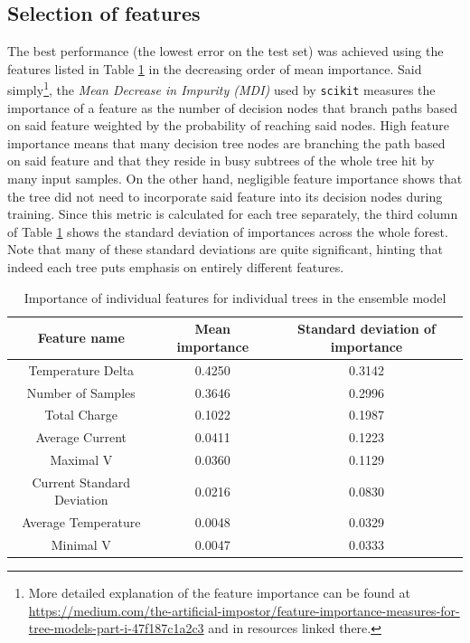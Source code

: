 \subsection{Selection of features}

The best performance (the lowest error on the test set) was achieved using the features listed in Table \ref{tab:12-importance} in the decreasing order of mean importance. Said simply\footnote{More detailed explanation of the feature importance can be found at \url{https://medium.com/the-artificial-impostor/feature-importance-measures-for-tree-models-part-i-47f187c1a2c3} and in resources linked there.}, the \textit{Mean Decrease in Impurity (MDI)} used by \texttt{scikit} measures the importance of a feature as the number of decision nodes that branch paths based on said feature weighted by the probability of reaching said nodes. 
High feature importance means that many decision tree nodes are branching the path based on said feature and that they reside in busy subtrees of the whole tree hit by many input samples.
On the other hand, negligible feature importance shows that the tree did not need to incorporate said feature into its decision nodes during training. Since this metric is calculated for each tree separately, the third column of Table \ref{tab:12-importance} shows the standard deviation of importances across the whole forest. Note that many of these standard deviations are quite significant, hinting that indeed each tree puts emphasis on entirely different features.

\begin{table}[]
    \centering
    \begin{tabular}{c|c|c}
    Feature name & Mean importance & Standard deviation of importance \\ \hline
Temperature Delta & 0.4250 & 0.3142 \\
Number of Samples & 0.3646 & 0.2996 \\
Total Charge   & 0.1022 & 0.1987 \\
Average Current & 0.0411 & 0.1223 \\
Maximal V      & 0.0360 & 0.1129 \\
Current Standard Deviation & 0.0216 & 0.0830 \\
Average Temperature & 0.0048 & 0.0329 \\
Minimal V      & 0.0047 & 0.0333 \\
    \end{tabular}
    \caption{Importance of individual features for individual trees in the ensemble model}
    \label{tab:12-importance}
\end{table}

